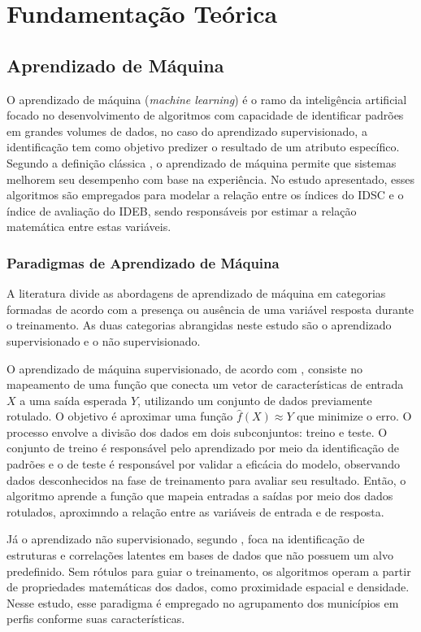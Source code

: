 \chapter{Fundamentação Teórica}

\section{Aprendizado de Máquina}
O aprendizado de máquina (\textit{machine learning}) é o ramo da inteligência artificial focado no desenvolvimento de algoritmos com capacidade de identificar padrões em grandes volumes de dados, no caso do aprendizado supervisionado, a identificação tem como objetivo predizer o resultado de um atributo específico. Segundo a definição clássica \cite{mitchell1997machine}, o aprendizado de máquina permite que sistemas melhorem seu desempenho com base na experiência. No estudo apresentado, esses algoritmos são empregados para modelar a relação entre os índices do IDSC e o índice de avaliação do IDEB, sendo responsáveis por estimar a relação matemática entre estas variáveis.

\subsection{Paradigmas de Aprendizado de Máquina}
A literatura divide as abordagens de aprendizado de máquina em categorias formadas de acordo com a presença ou ausência de uma variável resposta durante o treinamento. As duas categorias abrangidas neste estudo são o aprendizado supervisionado e o não supervisionado.

O aprendizado de máquina supervisionado, de acordo com , consiste no mapeamento de uma função que conecta um vetor de características de entrada $X$ a uma saída esperada $Y$, utilizando um conjunto de dados previamente rotulado. O objetivo é aproximar uma função $\hat{f}(X) \approx Y$ que minimize o erro. O processo envolve a divisão dos dados em dois subconjuntos: treino e teste. O conjunto de treino é responsável pelo aprendizado por meio da identificação de padrões e o de teste é responsável por validar a eficácia do modelo, observando dados desconhecidos na fase de treinamento para avaliar seu resultado. Então, o algoritmo aprende a função que mapeia entradas a saídas por meio dos dados rotulados, aproximndo a relação entre as variáveis de entrada e de resposta.

Já o aprendizado não supervisionado, segundo \cite{bishop2006pattern}, foca na identificação de estruturas e correlações latentes em bases de dados que não possuem um alvo predefinido. Sem rótulos para guiar o treinamento, os algoritmos operam a partir de propriedades matemáticas dos dados, como proximidade espacial e densidade. Nesse estudo, esse paradigma é empregado no agrupamento dos municípios em perfis conforme suas características.

